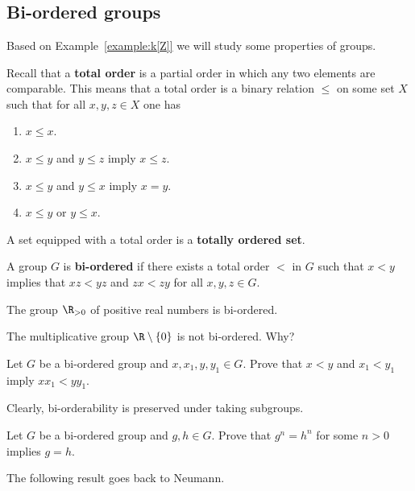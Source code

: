 \section{}

\subsection{Bi-ordered groups}

Based on Example~\ref{example:k[Z]} we will study 
some properties of groups. 

Recall that a \textbf{total order} is a partial order in which any two elements are comparable. This
means that a total order is a binary relation $\leq$ on some set $X$ 
such that for all $x,y,z\in X$ one has 
\begin{enumerate}
    \item $x\leq x$.
    \item $x\leq y$ and $y\leq z$ imply $x\leq z$.
    \item $x\leq y$ and $y\leq x$ imply $x=y$.
    \item $x\leq y$ or $y\leq x$. 
\end{enumerate}
A set equipped with a total order is a \textbf{totally ordered set}. 

\begin{definition}
	A group $G$ is \textbf{bi-ordered} if there exists a total order 
	$<$ in $G$
	such that $x<y$ implies that $xz<yz$ and $zx<zy$ for all $x,y,z\in G$.
\end{definition}

\begin{example}
	The group $\R_{>0}$ of positive real numbers is bi-ordered. 
\end{example}

The multiplicative group $\R\setminus\{0\}$ is not bi-ordered. Why?

\begin{exercise}
	Let $G$ be a bi-ordered group and $x,x_1,y,y_1\in G$. Prove that
	$x<y$ and $x_1<y_1$ imply $xx_1<yy_1$.
\end{exercise}

Clearly, bi-orderability is preserved under taking subgroups. 

\begin{exercise}
	Let $G$ be a bi-ordered group and $g,h\in G$. Prove that $g^n=h^n$
	for some $n>0$ implies $g=h$.
\end{exercise}

The following result goes back to Neumann.

